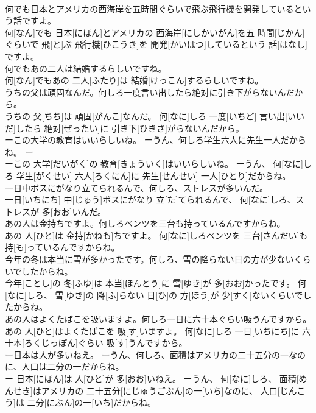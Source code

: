 \documentclass[8pt]{extreport}
\begin{document}
\begin{CJK}{UTF8}{min}
\\	何でも日本とアメリカの西海岸を五時間ぐらいで飛ぶ飛行機を開発しているという話ですよ。	
\\	何[なん]でも 日本[にほん]とアメリカの 西海岸[にしかいがん]を五 時間[じかん]ぐらいで 飛[と]ぶ 飛行機[ひこうき]を 開発[かいはつ]しているという 話[はなし]ですよ。
\\	何でもあの二人は結婚するらしいですね。	
\\	何[なん]でもあの 二人[ふたり]は 結婚[けっこん]するらしいですね。
\\	うちの父は頑固なんだ。何しろ一度言い出したら絶対に引き下がらないんだから。	
\\	うちの 父[ちち]は 頑固[がんこ]なんだ。 何[なに]しろ 一度[いちど] 言い出[いいだ]したら 絶対[ぜったい]に 引き下[ひきさ]がらないんだから。
\\	ーこの大学の教育はいいらしいね。 ーうん、何しろ学生六人に先生一人だからね。	ー
\\	ーこの 大学[だいがく]の 教育[きょういく]はいいらしいね。 ーうん、 何[なに]しろ 学生[がくせい] 六人[ろくにん]に 先生[せんせい] 一人[ひとり]だからね。
\\	一日中ボスにがなり立てられるんで、何しろ、ストレスが多いんだ。	
\\	一日[いちにち] 中[じゅう]ボスにがなり 立[た]てられるんで、 何[なに]しろ、ストレスが 多[おお]いんだ。
\\	あの人は金持ちですよ。何しろベンツを三台も持っているんですからね。	
\\	あの 人[ひと]は 金持[かねも]ちですよ。 何[なに]しろベンツを 三台[さんだい]も 持[も]っているんですからね。
\\	今年の冬は本当に雪が多かったです。何しろ、雪の降らない日の方が少ないくらいでしたからね。	
\\	今年[ことし]の 冬[ふゆ]は 本当[ほんとう]に 雪[ゆき]が 多[おお]かったです。 何[なに]しろ、 雪[ゆき]の 降[ふ]らない 日[ひ]の 方[ほう]が 少[すく]ないくらいでしたからね。
\\	あの人はよくたばこを吸いますよ。何しろ一日に六十本ぐらい吸うんですから。	
\\	あの 人[ひと]はよくたばこを 吸[す]いますよ。 何[なに]しろ 一日[いちにち]に 六十本[ろくじっぽん]ぐらい 吸[す]うんですから。
\\	ー日本は人が多いねえ。 ーうん、何しろ、面積はアメリカの二十五分の一なのに、人口は二分の一だからね。	
\\	ー 日本[にほん]は 人[ひと]が 多[おお]いねえ。 ーうん、 何[なに]しろ、 面積[めんせき]はアメリカの 二十五分[にじゅうごぶん]の一[いち]なのに、 人口[じんこう]は 二分[にぶん]の一[いち]だからね。

\end{CJK}
\end{document}
